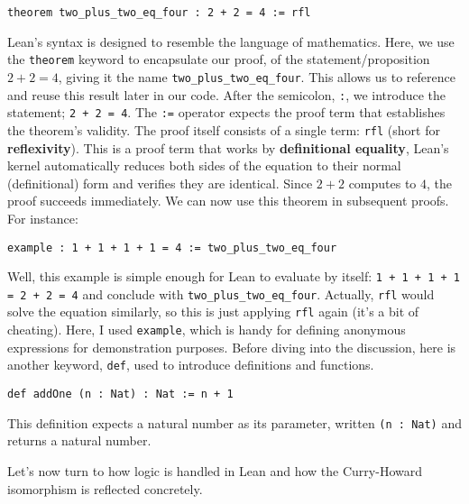 \begin{example}\mbox{}

\begin{lstlisting}[language=Lean]
    theorem two_plus_two_eq_four : 2 + 2 = 4 := rfl
\end{lstlisting}
Lean's syntax is designed to resemble the language of mathematics. 
Here, we use the \lstinline[language=lean]|theorem| keyword to encapsulate our proof, 
of the statement/proposition $2 + 2 = 4$, 
giving it the name \lstinline[language=lean]|two_plus_two_eq_four|. 
This allows us to reference and reuse this result later in our code.
After the semicolon, \lstinline[language=lean]|:|, we introduce the
statement; \lstinline[language=lean]|2 + 2 = 4|.
The \lstinline[language=lean]|:=| operator expects the 
proof term that establishes the theorem's validity. 
The proof itself consists of a single term: \lstinline[language=lean]|rfl| 
(short for \textbf{reflexivity}). This is a proof term that works by 
\textbf{definitional equality}, Lean's kernel automatically reduces both sides of the equation 
to their normal (definitional) form and verifies they are identical. 
Since $2 + 2$ computes to $4$, the proof succeeds immediately.
We can now use this theorem in subsequent proofs. For instance:
\begin{lstlisting}[language=Lean]
    example : 1 + 1 + 1 + 1 = 4 := two_plus_two_eq_four
\end{lstlisting}
Well, this example is simple enough for Lean to evaluate by itself:
\lstinline[language=lean]|1 + 1 + 1 + 1 = 2 + 2 = 4|
and conclude with \lstinline[language=lean]|two_plus_two_eq_four|. 
Actually, \lstinline[language=lean]|rfl| would solve the equation similarly, 
so this is just applying \lstinline[language=lean]|rfl| again (it's a bit of cheating).
Here, I used \lstinline[language=lean]|example|, which is handy for defining anonymous 
expressions for demonstration purposes.
Before diving into the discussion, here is another keyword, \lstinline[language=lean]|def|, 
used to introduce definitions and functions.

\begin{lstlisting}[language=Lean]
    def addOne (n : Nat) : Nat := n + 1
\end{lstlisting}
This definition expects a natural number as its parameter, written \lstinline[language=lean]|(n : Nat)|
and returns a natural number.
\end{example}
Let's now turn to how logic is handled in Lean and how the Curry-Howard 
isomorphism is reflected concretely.

